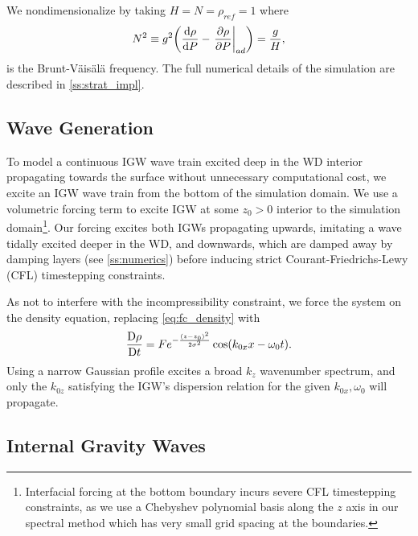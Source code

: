 \documentclass[twocolumn,
        nofootinbib,
        usenames, %
        dvipsnames %
    ]{revtex4-1}%
\newcommand*{\rd}[2]{\frac{\mathrm{d}#1}{\mathrm{d}#2}}
\newcommand*{\pd}[2]{\frac{\partial#1}{\partial#2}}
\newcommand*{\md}[2]{\frac{\mathrm{D}#1}{\mathrm{D}#2}}
\newcommand*{\at}[1]{\left.#1\right|}
\DeclarePairedDelimiter\p{\lparen}{\rparen}
\begin{document}
We nondimensionalize by taking $H = N = \rho_{ref} = 1$ where
\begin{equation}
    N^2 \equiv g^2\p*{\rd{\rho}{P} - \at{\pd{\rho}{P}}_{ad}}
        = \frac{g}{H},
\end{equation}
is the Brunt-V\"ais\"al\"a frequency. The full numerical details of the
simulation are described in \autoref{ss:strat_impl}.

\subsection{Wave Generation}

To model a continuous IGW wave train excited deep in the WD interior propagating
towards the surface without unnecessary computational cost, we excite an
IGW wave train from the bottom of the simulation domain. We use a volumetric
forcing term to excite IGW at some $z_0 > 0$ interior to the simulation
domain\footnote{Interfacial forcing at the bottom boundary incurs severe CFL
timestepping constraints, as we use a Chebyshev polynomial basis along the $z$
axis in our spectral method which has very small grid spacing at the
boundaries.}. Our forcing excites both IGWs propagating upwards, imitating a
wave tidally excited deeper in the WD, and downwards, which are damped away by
damping layers (see \autoref{ss:numerics}) before inducing strict
Courant-Friedrichs-Lewy (CFL) timestepping constraints.

As not to interfere with the incompressibility constraint, we force the system
on the density equation, replacing \autoref{eq:fc_density} with
\begin{equation}
    \md{\rho}{t} = Fe^{-\frac{(z - z_0)^2}{2\sigma^2}}
            \cos \p*{k_{0x}x - \omega_0 t}.
\end{equation}
Using a narrow Gaussian profile excites a broad $k_z$ wavenumber spectrum, and
only the $k_{0z}$ satisfying the IGW's dispersion relation for the given
$k_{0x}, \omega_0$ will propagate.

\subsection{Internal Gravity Waves}
\end{document}
